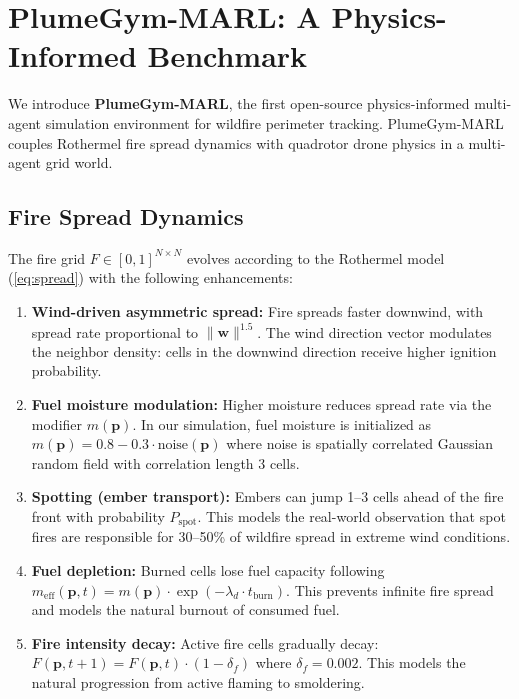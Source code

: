 \documentclass[12pt,a4paper]{article}
\DeclareRobustCommand{\vect}[1]{\bm{#1}}
\begin{document}
\section{PlumeGym-MARL: A Physics-Informed Benchmark}
\label{sec:environment}

We introduce \textbf{PlumeGym-MARL}, the first open-source physics-informed multi-agent simulation environment for wildfire perimeter tracking. PlumeGym-MARL couples Rothermel fire spread dynamics with quadrotor drone physics in a multi-agent grid world.

\subsection{Fire Spread Dynamics}

The fire grid $F \in [0, 1]^{N \times N}$ evolves according to the Rothermel model (\eqref{eq:spread}) with the following enhancements:

\begin{enumerate}[leftmargin=*]
    \item \textbf{Wind-driven asymmetric spread:} Fire spreads faster downwind, with spread rate proportional to $\|\vect{w}\|^{1.5}$. The wind direction vector modulates the neighbor density: cells in the downwind direction receive higher ignition probability.
    \item \textbf{Fuel moisture modulation:} Higher moisture reduces spread rate via the modifier $m(\vect{p})$. In our simulation, fuel moisture is initialized as $m(\vect{p}) = 0.8 - 0.3 \cdot \text{noise}(\vect{p})$ where noise is spatially correlated Gaussian random field with correlation length 3 cells.
    \item \textbf{Spotting (ember transport):} Embers can jump 1--3 cells ahead of the fire front with probability $P_{\text{spot}}$. This models the real-world observation that spot fires are responsible for 30--50\% of wildfire spread in extreme wind conditions.
    \item \textbf{Fuel depletion:} Burned cells lose fuel capacity following $m_{\text{eff}}(\vect{p}, t) = m(\vect{p}) \cdot \exp(-\lambda_d \cdot t_{\text{burn}})$. This prevents infinite fire spread and models the natural burnout of consumed fuel.
    \item \textbf{Fire intensity decay:} Active fire cells gradually decay: $F(\vect{p}, t+1) = F(\vect{p}, t) \cdot (1 - \delta_f)$ where $\delta_f = 0.002$. This models the natural progression from active flaming to smoldering.
\end{enumerate}
\end{document}
